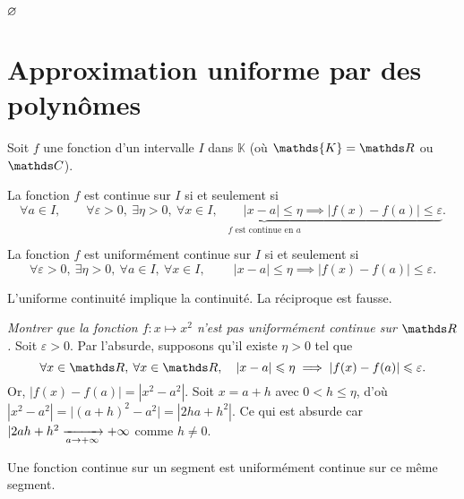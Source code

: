 \begin{crlr}
	$\varnothing$\/
\end{crlr}

\section{Approximation uniforme par des polynômes}

\begin{rmk}[Rappel]
	Soit $f$\/ une fonction d'un intervalle $I$\/ dans $\mathds{K}$\/ (où $\mathds{K} = \R$\/ ou $\C$).

	La fonction $f$\/ est continue sur $I$\/ si et seulement si \[
		\forall a \in I,\qquad\underbrace{\forall \varepsilon > 0,\:\exists \eta > 0,\:\forall x \in I,\qquad |x - a| \le \eta \implies |f(x) - f(a)| \le \varepsilon}_{f \text{ est continue en } a}
	.\]

	La fonction $f$\/ est uniformément continue sur $I$\/ si et seulement si \[
		\forall \varepsilon > 0,\:\exists \eta > 0,\:\forall a \in I,\: \forall x \in I,\:\qquad|x-a| \le \eta \implies |f(x) - f(a)| \le \varepsilon
	.\]

	L'uniforme continuité implique la continuité. La réciproque est fausse.
\end{rmk}

\begin{exo}
	{\slshape Montrer que la fonction $f: x \mapsto x^2$\/ n'est pas uniformément continue sur $\R$.}
	Soit $\varepsilon > 0$. Par l'absurde, supposons qu'il existe $\eta > 0$\/ tel que \[
		\forall x \in \R,\:\forall x \in \R,\quad|x-a|\le \eta \implies |f(x) - f(a)| \le \varepsilon
	.\] Or, $|f(x) - f(a)| = |x^2 - a^2|$. Soit $x = a + h$\/ avec $0 < h \le \eta$, d'où $|x^2 - a^2| = \big|(a+h)^2 - a^2\big| = |2ha + h^2|$. Ce qui est absurde car $|2a h + h^2 \xrightarrow[a \to +\infty]{} +\infty$\/ comme $h \neq 0$.
\end{exo}

\begin{thm}[Heine]
	Une fonction continue sur un segment est uniformément continue sur ce même segment.
\end{thm}
